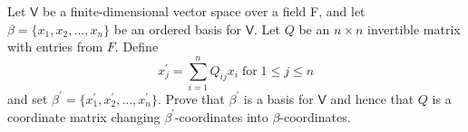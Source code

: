Let $\mathsf{V}$ be a finite-dimensional vector space over a field F,
and let $\beta=\{x_1,x_2,\dots,x_n\}$ be an ordered basis for
$\mathsf{V}$. Let $Q$ be an $n\times n$ invertible matrix with
entries from $F$. Define
\[
x^\prime_j = \sum\limits^n_{i=1} Q_{ij}x_i \;\text{for}\; 1\leq j\leq n
\]
and set $\beta^\prime =
\{x_1^\prime,x_2^\prime,\dots,x_n^\prime\}$. Prove that $\beta^\prime$
is a basis for $\mathsf{V}$ and hence that $Q$ is a coordinate matrix
changing $\beta^\prime$-coordinates into $\beta$-coordinates.
